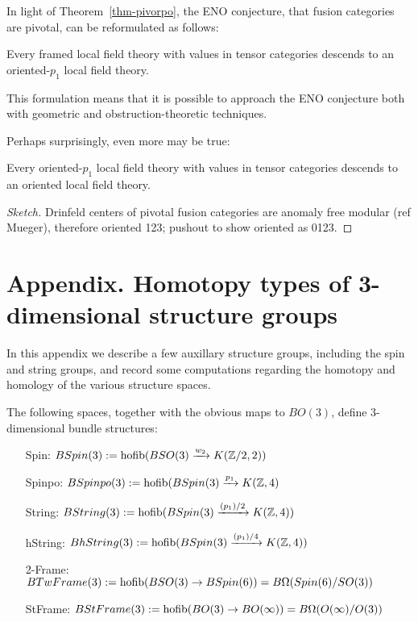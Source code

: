 \documentclass{amsart}
\begin{document}
In light of Theorem~\ref{thm-pivorpo}, the ENO conjecture, that fusion categories are pivotal, can be reformulated as follows:
\begin{conjecture}
Every framed local field theory with values in tensor categories descends to an oriented-$p_1$ local field theory.
\end{conjecture}
This formulation means that it is possible to approach the ENO conjecture both with geometric and obstruction-theoretic techniques.

Perhaps surprisingly, even more may be true:
\begin{conjecture}
Every oriented-$p_1$ local field theory with values in tensor categories descends to an oriented local field theory.
\end{conjecture}

\begin{proof}[Sketch]
Drinfeld centers of pivotal fusion categories are anomaly free modular (ref Mueger), therefore oriented 123; pushout to show oriented as 0123.
\end{proof}



\appendix

\renewcommand{\thetheorem}{A.\arabic{theorem}}
\setcounter{theorem}{0}
\section*{Appendix.  Homotopy types of 3-dimensional structure groups}

In this appendix we describe a few auxillary structure groups, including the spin and string groups, and record some computations regarding the homotopy and homology of the various structure spaces.

\begin{definition}
The following spaces, together with the obvious maps to $BO(3)$, define 3-dimensional bundle structures:
\begin{itemize}
\item[Spin:] $BSpin(3) := \operatorname{hofib}(BSO(3) \xrightarrow{w_2} K(\mathbb Z/2,2))$
\item[Spinpo:] $BSpinpo(3) := \operatorname{hofib}(BSpin(3) \xrightarrow{p_1} K(\mathbb Z,4)$
\item[String:] $BString(3) := \operatorname{hofib}(BSpin(3) \xrightarrow{(p_1)/2} K(\mathbb Z,4))$
\item[hString:] $BhString(3) := \operatorname{hofib}(BSpin(3) \xrightarrow{(p_1)/4} K(\mathbb Z,4))$
\item[2-Frame:] $BTwFrame(3) := \operatorname{hofib}(BSO(3) \rightarrow BSpin(6)) = B\Omega(Spin(6)/SO(3))$
\item[StFrame:] $BStFrame(3) := \operatorname{hofib}(BO(3) \rightarrow BO(\infty)) = B\Omega(O(\infty)/O(3))$
\end{itemize}
\end{definition}
\end{document}
